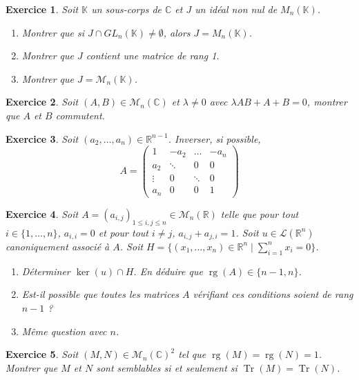 \documentclass[12pt]{article}
\newtheorem{exercise}{Exercice}[section]
\theoremstyle{remark}
\theoremstyle{remark}
\newcommand{\K}{\mathbb{K}} \newcommand{\R}{\mathbb{R}}
\newcommand{\C}{\mathbb{C}} \newcommand{\Q}{\mathbb{Q}}
\newcommand{\M}{\mathcal{M}} \renewcommand{\L}{\mathcal{L}}
\DeclareMathOperator{\rg}{rg} \DeclareMathOperator{\Tr}{Tr}
\begin{document}
\begin{exercise}
	Soit $\K$ un sous-corps de $\C$ et $J$ un idéal non nul de $M_{n}(\K)$.
	\begin{enumerate}
		\item
		Montrer que si $J\cap GL_{n}(\K)\neq\emptyset$, alors $J=M_{n}(\K)$.
		\item
		Montrer que $J$ contient une matrice de rang 1.
		\item
		Montrer que $J=\M_{n}(\K)$.
	\end{enumerate}
\end{exercise}

\begin{exercise}
	Soit $(A,B)\in\M_{n}(\C)$ et $\lambda\neq 0$ avec $\lambda AB+A+B=0$, montrer
	que $A$ et $B$ commutent.
\end{exercise}

\begin{exercise}
	Soit $(a_{2},\dots,a_{n})\in\R^{n-1}$. Inverser, si possible,
	$$
	A=
	\begin{pmatrix}
		1 		& -a_{2}	& \dots		& -a_{n}\\
		a_{2} 	& \ddots 	& 0			& 0\\
		\vdots 	& 0			& \ddots 	& 0\\
		a_{n}	& 0			& 0			& 1
	\end{pmatrix}
	$$
\end{exercise}

\begin{exercise}
	Soit $A=(a_{i,j})_{1\leqslant i,j\leqslant n}\in\M_{n}(\R)$ telle que pour
	tout $i\in\{1,\dots,n\}$, $a_{i,i}=0$ et pour tout $i\neq j$,
	$a_{i,j}+a_{j,i}=1$. Soit $u\in\L(\R^{n})$ canoniquement associé à $A$. Soit
	$H=\{(x_{1},\dots,x_{n})\in\R^{n}\mid\sum_{i=1}^{n}x_{i}=0\}$.
	\begin{enumerate}
		\item
		Déterminer $\ker(u)\cap H$. En déduire que $\rg(A)\in\{n-1,n\}$.
		\item
		Est-il possible que toutes les matrices $A$ vérifiant ces conditions
		soient de rang $n-1$ ?
		\item
		Même question avec $n$.
	\end{enumerate}
\end{exercise}

\begin{exercise}
	Soit $(M,N)\in\M_{n}(\C)^{2}$ tel que $\rg(M)=\rg(N)=1$. Montrer que $M$ et
	$N$ sont semblables si et seulement si $\Tr(M)=\Tr(N)$.
\end{exercise}
\end{document}
